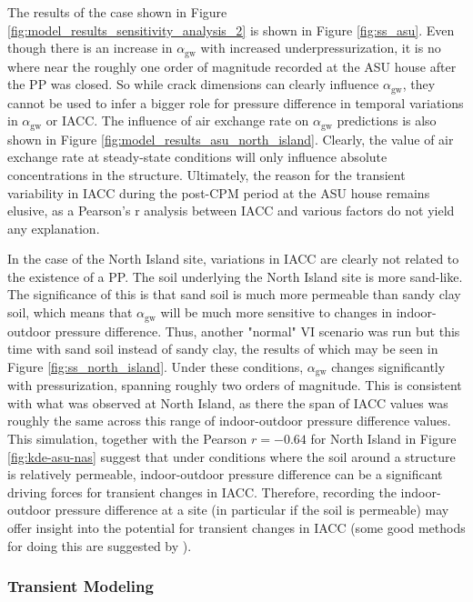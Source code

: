 \documentclass[journal=esthag,manuscript=article]{achemso}
\begin{document}
The results of the case shown in Figure \ref{fig:model_results_sensitivity_analysis_2} is shown in Figure \ref{fig:ss_asu}.
Even though there is an increase in $\alpha_\mathrm{gw}$ with increased underpressurization, it is no where near the roughly one order of magnitude recorded at the ASU house after the PP was closed.
So while crack dimensions can clearly influence $\alpha_\mathrm{gw}$, they cannot be used to infer a bigger role for pressure difference in temporal variations in $\alpha_\mathrm{gw}$ or IACC.
The influence of air exchange rate on $\alpha_\mathrm{gw}$ predictions is also shown in Figure \ref{fig:model_results_asu_north_island}.
Clearly, the value of air exchange rate at steady-state conditions will only influence absolute concentrations in the structure.
Ultimately, the reason for the transient variability in IACC during the post-CPM period at the ASU house remains elusive, as a Pearson's r analysis between IACC and various factors do not yield any explanation.

In the case of the North Island site, variations in IACC are clearly not related to the existence of a PP.
The soil underlying the North Island site is more sand-like\cite{hosangadi_high-frequency_2017}.
The significance of this is that sand soil is much more permeable than sandy clay soil, which means that $\alpha_\mathrm{gw}$ will be much more sensitive to changes in indoor-outdoor pressure difference.
Thus, another "normal" VI scenario was run but this time with sand soil instead of sandy clay, the results of which may be seen in Figure \ref{fig:ss_north_island}.
Under these conditions, $\alpha_\mathrm{gw}$ changes significantly with pressurization, spanning roughly two orders of magnitude.
This is consistent with what was observed at North Island, as there the span of IACC values was roughly the same across this range of indoor-outdoor pressure difference values.
This simulation, together with the Pearson $r = -0.64$ for North Island in Figure \ref{fig:kde-asu-nas} suggest that under conditions where the soil around a structure is relatively permeable, indoor-outdoor pressure difference can be a significant driving forces for transient changes in IACC.
Therefore, recording the indoor-outdoor pressure difference at a site (in particular if the soil is permeable) may offer insight into the potential for transient changes in IACC (some good methods for doing this are suggested by \citeauthor{nielsen_remediation_2017-1}\cite{nielsen_remediation_2017-1}).

\subsubsection{Transient Modeling}
\end{document}
